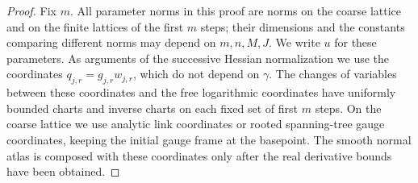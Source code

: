 \begin{proof}
Fix $m$. All parameter norms in this proof are norms on the coarse lattice and on the finite lattices of the first $m$ steps; their dimensions and the constants comparing different norms may depend on $m,n,M,J$. We write $u$ for these parameters. As arguments of the successive Hessian normalization we use the coordinates $q_{j,r}=g_{j,r}w_{j,r}$, which do not depend on $\gamma$. The changes of variables between these coordinates and the free logarithmic coordinates have uniformly bounded charts and inverse charts on each fixed set of first $m$ steps. On the coarse lattice we use analytic link coordinates or rooted spanning-tree gauge coordinates, keeping the initial gauge frame at the basepoint. The smooth normal atlas is composed with these coordinates only after the real derivative bounds have been obtained.


\end{proof}
